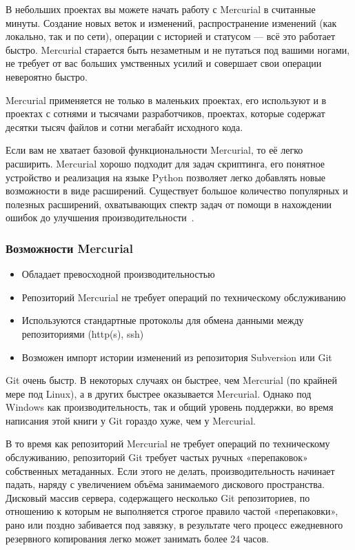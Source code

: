 \documentclass{../industrial-development}
\begin{document}
В небольших проектах вы можете начать работу с Mercurial в считанные минуты. Создание новых веток и изменений, распространение изменений (как локально, так и по сети), операции с историей и статусом — всё это работает быстро. Mercurial старается быть незаметным и не путаться под вашими ногами, не требует от вас больших умственных усилий и совершает свои операции невероятно быстро.

Mercurial применяется не только в маленьких проектах, его используют и в проектах с сотнями и тысячами разработчиков, проектах, которые содержат десятки тысяч файлов и сотни мегабайт исходного кода.

Если вам не хватает базовой функциональности Mercurial, то её легко расширить. Mercurial хорошо подходит для задач скриптинга, его понятное устройство и реализация на языке Python позволяет легко добавлять новые возможности в виде расширений. Существует большое количество популярных и полезных расширений, охватывающих спектр задач от помощи в нахождении ошибок до улучшения производительности~\cite[с.~6--7]{MercurialOReilly}.

\begin{frame} \frametitle{Возможности Mercurial}
  
  \begin{itemize}
  \item Обладает превосходной производительностью
  \item Репозиторий Mercurial не требует операций по техническому обслуживанию
  \item Используются стандартные протоколы для обмена данными между репозиториями (http(s), ssh)
  \item Возможен импорт истории изменений из репозитория Subversion или Git
  \end{itemize}
\end{frame}

\lecturenotes

Git очень быстр. В некоторых случаях он быстрее, чем Mercurial (по крайней мере под Linux), а в других быстрее оказывается Mercurial. Однако под Windows как производительность, так и общий уровень поддержки, во время написания этой книги у Git гораздо хуже, чем у Mercurial.

В то время как репозиторий Mercurial не требует операций по техническому обслуживанию, репозиторий Git требует частых ручных «перепаковок» собственных метаданных. Если этого не делать, производительность начинает падать, наряду с увеличением объёма занимаемого дискового пространства. Дисковый массив сервера, содержащего несколько Git репозиториев, по отношению к которым не выполняется строгое правило частой «перепаковки», рано или поздно забивается под завязку, в результате чего процесс ежедневного резервного копирования легко может занимать более 24 часов. 
\end{document}
